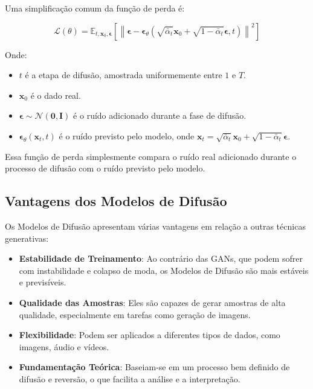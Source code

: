\documentclass{article}
\begin{document}
Uma simplificação comum da função de perda é:

\begin{equation}
    \mathcal{L}(\theta) = \mathbb{E}_{t, \mathbf{x}_0, \boldsymbol{\epsilon}} \left[ \left\| \boldsymbol{\epsilon} - \boldsymbol{\epsilon}_\theta(\sqrt{\bar{\alpha}_t} \mathbf{x}_0 + \sqrt{1 - \bar{\alpha}_t} \boldsymbol{\epsilon}, t) \right\|^2 \right]
\end{equation}

Onde:
\begin{itemize}
    \item $t$ é a etapa de difusão, amostrada uniformemente entre $1$ e $T$.
    \item $\mathbf{x}_0$ é o dado real.
    \item $\boldsymbol{\epsilon} \sim \mathcal{N}(\mathbf{0}, \mathbf{I})$ é o ruído adicionado durante a fase de difusão.
    \item $\boldsymbol{\epsilon}_\theta(\mathbf{x}_t, t)$ é o ruído previsto pelo modelo, onde $\mathbf{x}_t = \sqrt{\bar{\alpha}_t} \mathbf{x}_0 + \sqrt{1 - \bar{\alpha}_t} \boldsymbol{\epsilon}$.
\end{itemize}

Essa função de perda simplesmente compara o ruído real adicionado durante o processo de difusão com o ruído previsto pelo modelo.

\subsection{Vantagens dos Modelos de Difusão}

Os Modelos de Difusão apresentam várias vantagens em relação a outras técnicas generativas:
\begin{itemize}
    \item \textbf{Estabilidade de Treinamento}: Ao contrário das GANs, que podem sofrer com instabilidade e colapso de moda, os Modelos de Difusão são mais estáveis e previsíveis.
    \item \textbf{Qualidade das Amostras}: Eles são capazes de gerar amostras de alta qualidade, especialmente em tarefas como geração de imagens.
    \item \textbf{Flexibilidade}: Podem ser aplicados a diferentes tipos de dados, como imagens, áudio e vídeos.
    \item \textbf{Fundamentação Teórica}: Baseiam-se em um processo bem definido de difusão e reversão, o que facilita a análise e a interpretação.
\end{itemize}
\end{document}
